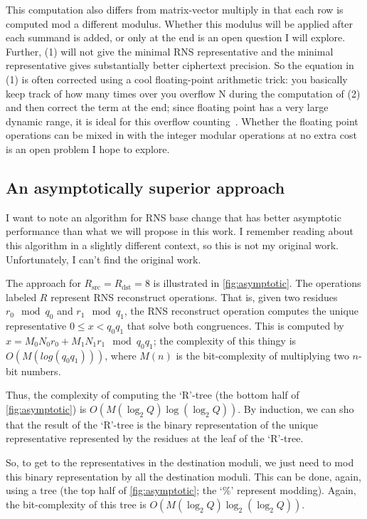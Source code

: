 This computation also differs from matrix-vector multiply in that each row is
computed mod a different modulus.
Whether this modulus will be applied after each summand is added, or only at
the end is an open question I will explore.
Further, (1) will not give the minimal RNS representative and the minimal
representative gives substantially better ciphertext precision\cite{bajard2017full}.
So the equation in (1) is often corrected using a cool floating-point
arithmetic trick: you basically keep track of how many times over you overflow
N during the computation of (2) and then correct the term at the end; since
floating point has a very large dynamic range, it is ideal for this overflow
counting~\cite{lattigo-github}.
Whether the floating point operations can be mixed in with the integer modular
operations at no extra cost is an open problem I hope to explore.


\subsection{An asymptotically superior approach}
\label{sec:asymptotic}

\figAsymptotic

I want to note an algorithm for RNS base change that has better asymptotic
performance than what we will propose in this work.
I remember reading about this algorithm in a slightly different context, so
this is not my original work.
Unfortunately, I can't find the original work.

The approach for $R_{\textrm{src}} = R_{\textrm{dst}} = 8$ is illustrated in
\autoref{fig:asymptotic}. The operations labeled $R$ represent RNS reconstruct
operations. That is, given two residues $r_0 \mod q_0$ and $r_1 \mod q_1$, the
RNS reconstruct operation computes the unique representative
$0 \leq x < q_0q_1$ that solve both congruences. This is computed by $x =
M_0N_0r_0 + M_1N_1r_1 \mod q_0q_1$; the complexity of this thingy is
$O(M(log(q_0q_1)))$, where $M(n)$ is the bit-complexity of multiplying two
$n$-bit numbers.

Thus, the complexity of computing the `R'-tree (the bottom half of
\autoref{fig:asymptotic}) is $O(M(\log_2Q)\log(\log_2Q))$. By induction, we can
sho that the result of the `R'-tree is the binary representation of the unique
representative represented by the residues at the leaf of the `R'-tree.

So, to get to the representatives in the destination moduli, we just need to
mod this binary representation by all the destination moduli. This can be done,
again, using a tree (the top half of \autoref{fig:asymptotic}; the `\%'
represent modding). Again, the bit-complexity of this tree is
$O(M(\log_2Q)\log_2(\log_2Q))$.


